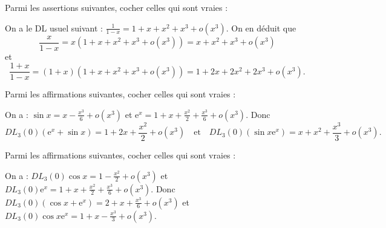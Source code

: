 \begin{question}
Parmi les assertions suivantes, cocher celles qui sont vraies :
\begin{answers}  
\end{answers}
\begin{explanations}
On a le DL usuel suivant : $\displaystyle \frac{1}{1-x}=1+x+x^2+x^3+o(x^3)$. On en déduit que 
$$\frac{x}{1-x}=x(1+x+x^2+x^3+o(x^3))=x+x^2+x^3+o(x^3)$$
et
$$\frac{1+x}{1-x}=(1+x)(1+x+x^2+x^3+o(x^3))=1+2x+2x^2+2x^3+o(x^3).$$
\end{explanations}
\end{question}

\begin{question}
Parmi les affirmations suivantes, cocher celles qui sont vraies :
\begin{answers} 
\end{answers}
\begin{explanations}
On a : $\displaystyle \sin x=x-\frac{x^3}{6}+o(x^3)$ et $\displaystyle \mathrm{e}^{x}=1+x+\frac{x^2}{2}+\frac{x^3}{6}+o(x^3)$. Donc
$$DL_3(0)\left(\mathrm{e}^{x}+\sin x\right)=1+2x+\frac{x^2}{2}+o(x^3)\quad\mbox{et}\quad DL_3(0)\left(\sin x\mathrm{e}^{x}\right)=x+x^2+\frac{x^3}{3}+o(x^3).$$
\end{explanations}
\end{question}

\begin{question}
Parmi les affirmations suivantes, cocher celles qui sont vraies :
\begin{answers}  
\end{answers}
\begin{explanations}
On a : $\displaystyle DL_3(0)\cos x=1-\frac{x^2}{2}+o(x^3)$ et $\displaystyle DL_3(0)\mathrm{e}^x=1+x+\frac{x^2}{2}+\frac{x^3}{6}+o(x^3)$. Donc $\displaystyle DL_3(0)\left(\cos x+\mathrm{e}^x\right)=2+x+\frac{x^3}{6}+o(x^3)$ et $\displaystyle DL_3(0)\cos x\mathrm{e}^x=1+x-\frac{x^3}{3}+o(x^3)$.
\end{explanations}
\end{question}

